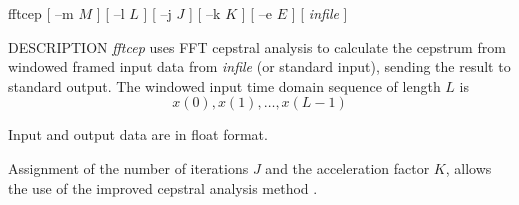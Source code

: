 % 
% 
% 
% 
%                                                                        
%
\hypertarget{fftcep}{}

\begin{synopsis}
\item[fftcep] [ --m $M$ ] [ --l $L$ ] [ --j $J$ ] [ --k $K$ ] 
	    [ --e $E$ ] [ {\em infile} ] 
\end{synopsis}

\begin{qsection}{DESCRIPTION}
{\em fftcep} uses FFT cepstral analysis to calculate the cepstrum 
from windowed framed input data from {\em infile} (or standard input), 
sending the result to standard output.
The windowed input time domain sequence of length $L$ is
\begin{displaymath}
  x(0),x(1),\dots,x(L-1)
\end{displaymath}
\par
Input and output data are in float format.
\par
Assignment of the number of iterations $J$ and
the acceleration factor $K$, allows the use of the improved cepstral
analysis method \cite{ref:icep-IECE}.
\end{qsection}

